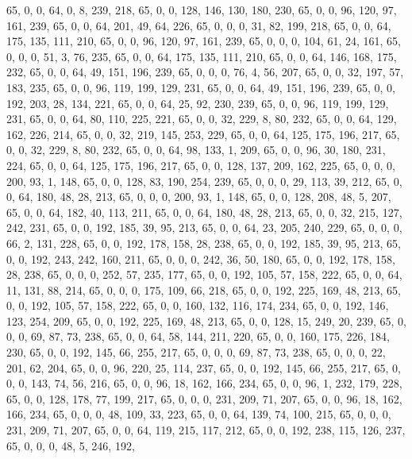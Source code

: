 \begin{DoxyCode}
       65, 0, 0, 64, 0, 8, 239, 218, 65, 0, 0, 128, 146, 130, 180, 230, 65, 0, 0, 96, 120, 97, 161, 239, 65, 0, 0,
       64, 201, 49, 64, 226, 65, 0, 0, 0, 31, 82, 199, 218, 65, 0, 0, 64, 175, 135, 111, 210, 65, 0, 0, 96, 120, 97,
       161, 239, 65, 0, 0, 0, 104, 61, 24, 161, 65, 0, 0, 0, 51, 3, 76, 235, 65, 0, 0, 64, 175, 135, 111, 210, 65,
       0, 0, 64, 146, 168, 175, 232, 65, 0, 0, 64, 49, 151, 196, 239, 65, 0, 0, 0, 76, 4, 56, 207, 65, 0, 0, 32,
       197, 57, 183, 235, 65, 0, 0, 96, 119, 199, 129, 231, 65, 0, 0, 64, 49, 151, 196, 239, 65, 0, 0, 192, 203, 28,
       134, 221, 65, 0, 0, 64, 25, 92, 230, 239, 65, 0, 0, 96, 119, 199, 129, 231, 65, 0, 0, 64, 80, 110, 225,
       221, 65, 0, 0, 32, 229, 8, 80, 232, 65, 0, 0, 64, 129, 162, 226, 214, 65, 0, 0, 32, 219, 145, 253, 229, 65, 0,
       0, 64, 125, 175, 196, 217, 65, 0, 0, 32, 229, 8, 80, 232, 65, 0, 0, 64, 98, 133, 1, 209, 65, 0, 0, 96, 30,
       180, 231, 224, 65, 0, 0, 64, 125, 175, 196, 217, 65, 0, 0, 128, 137, 209, 162, 225, 65, 0, 0, 0, 200, 93, 1,
       148, 65, 0, 0, 128, 83, 190, 254, 239, 65, 0, 0, 0, 29, 113, 39, 212, 65, 0, 0, 64, 180, 48, 28, 213, 65, 0,
       0, 0, 200, 93, 1, 148, 65, 0, 0, 128, 208, 48, 5, 207, 65, 0, 0, 64, 182, 40, 113, 211, 65, 0, 0, 64, 180,
       48, 28, 213, 65, 0, 0, 32, 215, 127, 242, 231, 65, 0, 0, 192, 185, 39, 95, 213, 65, 0, 0, 64, 23, 205, 240,
       229, 65, 0, 0, 0, 66, 2, 131, 228, 65, 0, 0, 192, 178, 158, 28, 238, 65, 0, 0, 192, 185, 39, 95, 213, 65, 0,
       0, 192, 243, 242, 160, 211, 65, 0, 0, 0, 242, 36, 50, 180, 65, 0, 0, 192, 178, 158, 28, 238, 65, 0, 0, 0,
       252, 57, 235, 177, 65, 0, 0, 192, 105, 57, 158, 222, 65, 0, 0, 64, 11, 131, 88, 214, 65, 0, 0, 0, 175, 109,
       66, 218, 65, 0, 0, 192, 225, 169, 48, 213, 65, 0, 0, 192, 105, 57, 158, 222, 65, 0, 0, 160, 132, 116, 174,
       234, 65, 0, 0, 192, 146, 123, 254, 209, 65, 0, 0, 192, 225, 169, 48, 213, 65, 0, 0, 128, 15, 249, 20, 239, 65,
       0, 0, 0, 69, 87, 73, 238, 65, 0, 0, 64, 58, 144, 211, 220, 65, 0, 0, 160, 175, 226, 184, 230, 65, 0, 0,
       192, 145, 66, 255, 217, 65, 0, 0, 0, 69, 87, 73, 238, 65, 0, 0, 0, 22, 201, 62, 204, 65, 0, 0, 96, 220, 25,
       114, 237, 65, 0, 0, 192, 145, 66, 255, 217, 65, 0, 0, 0, 143, 74, 56, 216, 65, 0, 0, 96, 18, 162, 166, 234, 65,
       0, 0, 96, 1, 232, 179, 228, 65, 0, 0, 128, 178, 77, 199, 217, 65, 0, 0, 0, 231, 209, 71, 207, 65, 0, 0, 96,
       18, 162, 166, 234, 65, 0, 0, 0, 48, 109, 33, 223, 65, 0, 0, 64, 139, 74, 100, 215, 65, 0, 0, 0, 231, 209,
       71, 207, 65, 0, 0, 64, 119, 215, 117, 212, 65, 0, 0, 192, 238, 115, 126, 237, 65, 0, 0, 0, 48, 5, 246, 192,

\end{DoxyCode}
